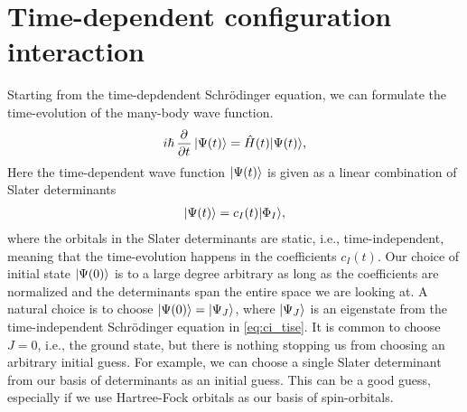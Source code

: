     \section{Time-dependent configuration interaction}
        Starting from the time-depdendent Schrödinger equation, we can formulate
        the time-evolution of the many-body wave function.
        \begin{align}
            i\hslash \dpd[]{}{t}\ket{\Psi(t)}
            = \hamil(t)\ket{\Psi(t)},
            \label{eq:ci_tdse}
        \end{align}
        Here the time-dependent wave function $| \Psi(t) \rangle$ is given as a
        linear combination of Slater determinants
        \begin{align}
            | \Psi(t) \rangle = c_{I}(t) | \Phi_I \rangle,
            \label{eq:ci_td_wave}
        \end{align}
        where the orbitals in the Slater determinants are static, i.e.,
        time-independent, meaning that the time-evolution happens in the
        coefficients $c_{I}(t)$.
        Our choice of initial state $| \Psi(0) \rangle$ is to a large degree
        arbitrary as long as the coefficients are normalized and the
        determinants span the entire space we are looking at.
        A natural choice is to choose $| \Psi(0) \rangle = | \Psi_J \rangle$, where
        $| \Psi_J \rangle$ is an eigenstate from the time-independent Schrödinger
        equation in \autoref{eq:ci_tise}.
        It is common to choose $J = 0$, i.e., the ground state, but there is
        nothing stopping us from choosing an arbitrary initial guess.
        For example, we can choose a single Slater determinant from our basis of
        determinants as an initial guess.
        This can be a good guess, especially if we use Hartree-Fock orbitals as
        our basis of spin-orbitals.

